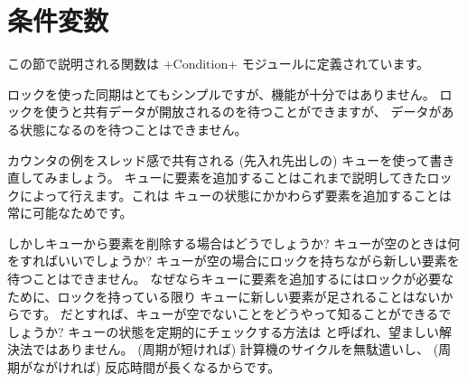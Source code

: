 \section{条件変数}

この節で説明される関数は \ml+Condition+ モジュールに定義されています。

ロックを使った同期はとてもシンプルですが、機能が十分ではありません。
ロックを使うと共有データが開放されるのを待つことができますが、
データがある状態になるのを待つことはできません。

カウンタの例をスレッド感で共有される (先入れ先出しの) キューを使って書き直してみましょう。
キューに要素を追加することはこれまで説明してきたロックによって行えます。これは
キューの状態にかかわらず要素を追加することは常に可能なためです。

しかしキューから要素を削除する場合はどうでしょうか?
キューが空のときは何をすればいいでしょうか?
キューが空の場合にロックを持ちながら新しい要素を待つことはできません。
なぜならキューに要素を追加するにはロックが必要なために、ロックを持っている限り
キューに新しい要素が足されることはないからです。
だとすれば、キューが空でないことをどうやって知ることができるでしょうか?
キューの状態を定期的にチェックする方法は  と呼ばれ、望ましい解決法ではありません。
(周期が短ければ) 計算機のサイクルを無駄遣いし、 (周期がながければ) 反応時間が長くなるからです。

